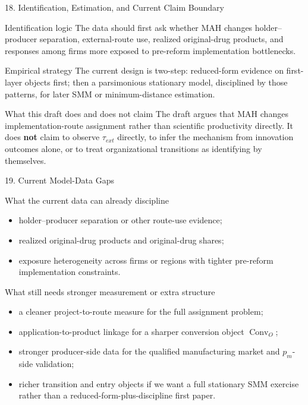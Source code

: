 \documentclass[aspectratio=169,11pt]{beamer}
\begin{document}
\begin{frame}{18. Identification, Estimation, and Current Claim Boundary}
\footnotesize
\begin{block}{Identification logic}
The data should first ask whether MAH changes holder--producer separation, external-route use, realized original-drug products, and responses among firms more exposed to pre-reform implementation bottlenecks.
\end{block}

\begin{block}{Empirical strategy}
The current design is two-step: reduced-form evidence on first-layer objects first; then a parsimonious stationary model, disciplined by those patterns, for later SMM or minimum-distance estimation.
\end{block}

\begin{block}{What this draft does and does not claim}
The draft argues that MAH changes implementation-route assignment rather than scientific productivity directly. It does \textbf{not} claim to observe \(\tau_{ext}\) directly, to infer the mechanism from innovation outcomes alone, or to treat organizational transitions as identifying by themselves.
\end{block}
\end{frame}

\begin{frame}{19. Current Model-Data Gaps}
\footnotesize
\begin{block}{What the current data can already discipline}
\begin{itemize}
\item holder--producer separation or other route-use evidence;
\item realized original-drug products and original-drug shares;
\item exposure heterogeneity across firms or regions with tighter pre-reform implementation constraints.
\end{itemize}
\end{block}

\begin{block}{What still needs stronger measurement or extra structure}
\begin{itemize}
\item a cleaner project-to-route measure for the full assignment problem;
\item application-to-product linkage for a sharper conversion object \(\operatorname{Conv}_O\);
\item stronger producer-side data for the qualified manufacturing market and \(p_m\)-side validation;
\item richer transition and entry objects if we want a full stationary SMM exercise rather than a reduced-form-plus-discipline first paper.
\end{itemize}
\end{block}
\end{frame}
\end{document}
